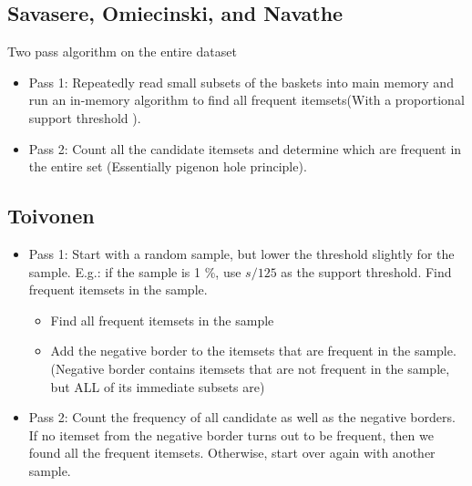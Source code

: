\subsection{Savasere, Omiecinski, and Navathe}
Two pass algorithm on the entire dataset 
    \begin{itemize}
        \item Pass 1: Repeatedly read small subsets of the baskets into main memory and run an in-memory algorithm to find all frequent itemsets(With a proportional support threshold ).
        \item Pass 2: Count all the candidate itemsets and determine which are frequent in the entire set (Essentially pigenon hole principle). 
    \end{itemize}


\subsection{Toivonen} 

    \begin{itemize}
        \item Pass 1: Start with a random sample, but lower the threshold slightly for the sample. E.g.: if the sample is 1 \%,  use $s / 125$ as the support threshold. Find frequent itemsets in the sample. 
            \begin{itemize}
                \item Find all frequent itemsets in the sample 
                \item Add the negative border to the itemsets that are frequent in the sample. (Negative border contains itemsets that are not frequent in the sample, but ALL of its immediate subsets are)
            \end{itemize}
        \item Pass 2: Count the frequency of all candidate as well as the negative borders. If no itemset from the negative border turns out to be frequent, then we found all the frequent itemsets. Otherwise, start over again with another sample. 
    \end{itemize}